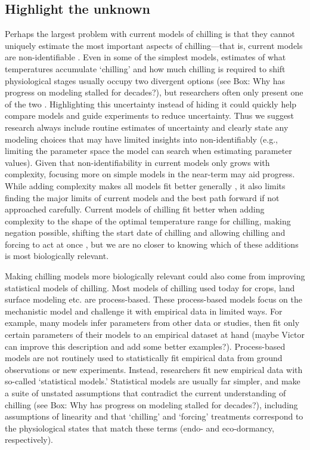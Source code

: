\documentclass[11pt]{article}
\begin{document}
\subsection*{Highlight the unknown} 
Perhaps the largest problem with current models of chilling is that they cannot uniquely estimate the most important aspects of chilling---that is, current models are non-identifiable \citep{gelmanhill}. Even in some of the simplest models, estimates of what temperatures accumulate `chilling' and how much chilling is required to shift physiological stages usually occupy two divergent options (see Box: Why has progress on modeling stalled for decades?), but researchers often only present one of the two \citep{chuine2016}. Highlighting this uncertainty instead of hiding it could quickly help compare models and guide experiments to reduce uncertainty. Thus we suggest research always include routine estimates of uncertainty and clearly state any modeling choices that may have limited insights into non-identifiably (e.g., limiting the parameter space the model can search when estimating parameter values). Given that non-identifiability in current models only grows with complexity, focusing more on simple models in the near-term may aid progress. While adding complexity makes all models fit better generally \citep{statrethink}, it also limits finding the major limits of current models and the best path forward if not approached carefully. Current models of chilling fit better when adding complexity to the shape of the optimal temperature range for chilling, making negation possible, shifting the start date of chilling and allowing chilling and forcing to act at once \citep{lued2009,gusewell2017,hanninen1990modelling,Kramer1994}, but we are no closer to knowing which of these additions is most biologically relevant. 

Making chilling models more biologically relevant could also come from improving statistical models of chilling. Most models of chilling used today for crops, land surface modeling etc. are process-based. These process-based models focus on the mechanistic model and challenge it with empirical data in limited ways. For example, many models infer parameters from other data or studies, then fit only certain parameters of their models to an empirical dataset at hand \citep{richardson1974} (maybe Victor can improve this description and add some better examples?). Process-based models are not routinely used to statistically fit empirical data from ground observations or new experiments. Instead, researchers fit new empirical data with so-called `statistical models.' Statistical models are usually far simpler, and make a suite of unstated assumptions that contradict the current understanding of chilling (see Box: Why has progress on modeling stalled for decades?), including assumptions of linearity and that `chilling' and `forcing' treatments correspond to the physiological states that match these terms (endo- and eco-dormancy, respectively). 
\end{document}
